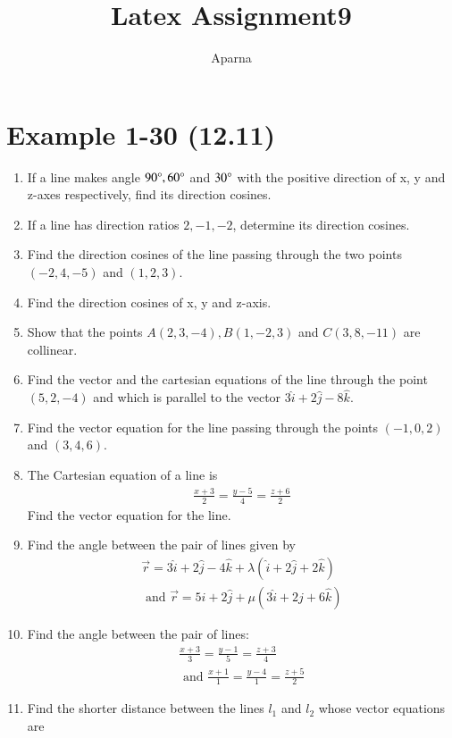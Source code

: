 \documentclass{article}
\theoremstyle{remark}
\begin{document}
\title{Latex Assignment9}
\author{Aparna}
\maketitle
\section*{Example 1-30 (12.11)}
\begin{enumerate}
\item If a line makes angle $90 \degree, 60 \degree$ and $30 \degree$ with the positive direction of x, y and z-axes respectively, find its direction cosines.
\item If a line has direction ratios $2, -1, -2$, determine its direction cosines.
\item Find the direction cosines of the line passing through the two points $(-2, 4, -5)$ and $(1, 2, 3)$.
\item Find the direction cosines of x, y and z-axis.
\item Show that the points $A(2, 3, -4), B(1, -2, 3)$ and $C(3, 8, -11)$ are collinear.
\item Find the vector and the cartesian equations of the line through the point $(5, 2, -4)$ and which is parallel to the vector $3 \hat{i}+2 \hat{j}- 8 \hat{k}$.
\item Find the vector equation for the line passing through the points $(-1, 0, 2)$ and $(3, 4, 6)$.
\item The Cartesian equation of a line is
\begin{align}
\frac{x+3}{2}= \frac{y-5}{4}= \frac{z+6}{2}
\end{align} 
Find the vector equation for the line.
\item Find the angle between the pair of lines given by
\begin{align}
\overrightarrow{r}= 3 \hat{i}+ 2 \hat{j}- 4 \hat{k}+ \lambda(\hat{i}+ 2 \hat{j}+ 2 \hat{k}) \\
\text{ and } \overrightarrow{r}= 5 \hat{i}+ 2 \hat{j}+ \mu(3 \hat{i}+ 2 \hat{j}+ 6 \hat{k}) 
\end{align}
\item Find the angle between the pair of lines:
\begin{align}
\frac{x+3}{3}= \frac{y-1}{5}= \frac{z+3}{4}\\
\text{ and }\frac{x+1}{1}= \frac{y-4}{1}= \frac{z+5}{2}
\end{align}
\item Find the shorter distance between the lines $l_1$ and $l_2$ whose vector equations are

\end{enumerate}
\end{document}
